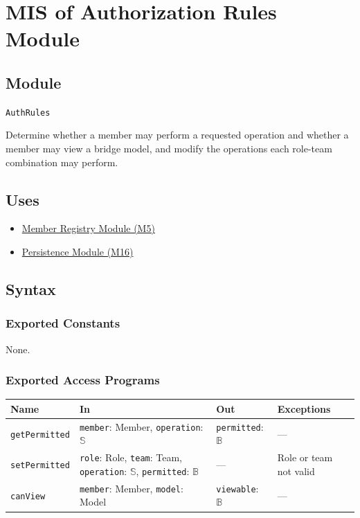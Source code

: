 \documentclass[12pt, titlepage]{article}
\begin{document}
\newpage

\section{MIS of Authorization Rules Module} \label{mAuthz}

\subsection{Module}
\texttt{AuthRules}

Determine whether a member may perform a requested operation and whether a member may view a bridge model, and modify the operations each role-team combination may perform.

\subsection{Uses}
\begin{itemize}
  \item \hyperref[mMembers]{Member Registry Module (M5)}
  \item \hyperref[mPersist]{Persistence Module (M16)}
\end{itemize}

\subsection{Syntax}

\subsubsection{Exported Constants}
None.

\subsubsection{Exported Access Programs}
\begin{tabularx}{\textwidth}{p{3cm} p{4.8cm} p{2.6cm} X}
\toprule
\textbf{Name} & \textbf{In} & \textbf{Out} & \textbf{Exceptions} \\
\midrule
\texttt{getPermitted} & \texttt{member}: Member, \texttt{operation}: $\mathbb{S}$ & \texttt{permitted}: $\mathbb{B}$ & --- \\
\texttt{setPermitted} & \texttt{role}: Role, \texttt{team}: Team, \texttt{operation}: $\mathbb{S}$, \texttt{permitted}: $\mathbb{B}$ & --- & Role or team not valid \\
\texttt{canView} & \texttt{member}: Member, \texttt{model}: Model & \texttt{viewable}: $\mathbb{B}$ & --- \\
\bottomrule
\end{tabularx}
\end{document}
